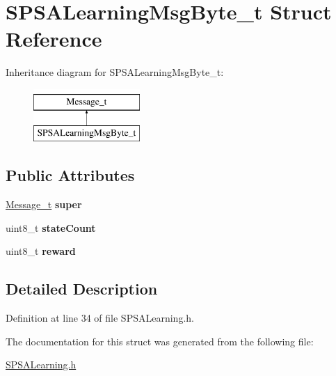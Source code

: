 \hypertarget{structSPSALearningMsgByte__t}{
\section{SPSALearningMsgByte\_\-t Struct Reference}
\label{structSPSALearningMsgByte__t}
}
Inheritance diagram for SPSALearningMsgByte\_\-t:\begin{figure}[H]
\begin{center}
\leavevmode
\includegraphics[height=2.000000cm]{structSPSALearningMsgByte__t}
\end{center}
\end{figure}
\subsection*{Public Attributes}
\begin{DoxyCompactItemize}
\item 
\hypertarget{structSPSALearningMsgByte__t_a03628086a6d91f6485d96c47f2313cd7}{
\hyperlink{structMessage__t}{Message\_\-t} {\bfseries super}}
\label{structSPSALearningMsgByte__t_a03628086a6d91f6485d96c47f2313cd7}

\item 
\hypertarget{structSPSALearningMsgByte__t_add5be01bb0bee822602e50f92a68a959}{
uint8\_\-t {\bfseries stateCount}}
\label{structSPSALearningMsgByte__t_add5be01bb0bee822602e50f92a68a959}

\item 
\hypertarget{structSPSALearningMsgByte__t_a5c39746211a517834e8da96053df91d5}{
uint8\_\-t {\bfseries reward}}
\label{structSPSALearningMsgByte__t_a5c39746211a517834e8da96053df91d5}

\end{DoxyCompactItemize}


\subsection{Detailed Description}


Definition at line 34 of file SPSALearning.h.



The documentation for this struct was generated from the following file:\begin{DoxyCompactItemize}
\item 
\hyperlink{SPSALearning_8h}{SPSALearning.h}\end{DoxyCompactItemize}
